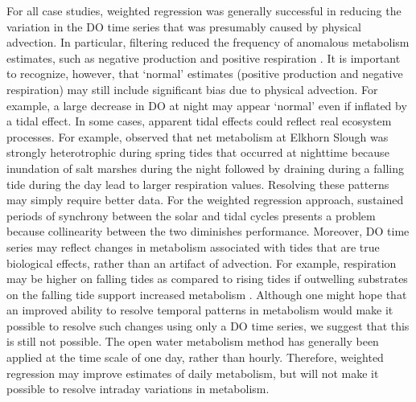\documentclass[letterpaper,12pt,oneside]{article}\usepackage[]{graphicx}\usepackage[]{color}
\begin{document}
For all case studies, weighted regression was generally successful in reducing the variation in the \ac{DO} time series that was presumably caused by physical advection.  In particular, filtering reduced the frequency of anomalous metabolism estimates, such as negative production and positive respiration \citep{Needoba12}.  It is important to recognize, however, that `normal' estimates (positive production and negative respiration) may still include significant bias due to physical advection.  For example, a large decrease in \ac{DO} at night may appear `normal' even if inflated by a tidal effect.  In some cases, apparent tidal effects could reflect real ecosystem processes. For example, \citet{Nidzieko14} observed that net metabolism at Elkhorn Slough was strongly heterotrophic during spring tides that occurred at nighttime because inundation of salt marshes during the night followed by draining during a falling tide during the day lead to larger respiration values.  Resolving these patterns may simply require better data.  For the weighted regression approach, sustained periods of synchrony between the solar and tidal cycles presents a problem because collinearity between the two diminishes performance.  Moreover, \ac{DO} time series may reflect changes in metabolism associated with tides that are true biological effects, rather than an artifact of advection.  For example, respiration may be higher on falling tides as compared to rising tides if outwelling substrates on the falling tide support increased metabolism \citep{Sasaki09}.  Although one might hope that an improved ability to resolve temporal patterns in metabolism would make it possible to resolve such changes using only a \ac{DO} time series, we suggest that this is still not possible.  The open water metabolism method has generally been applied at the time scale of one day, rather than hourly.  Therefore, weighted regression may improve estimates of daily metabolism, but will not make it possible to resolve intraday variations in metabolism.   
\end{document}

